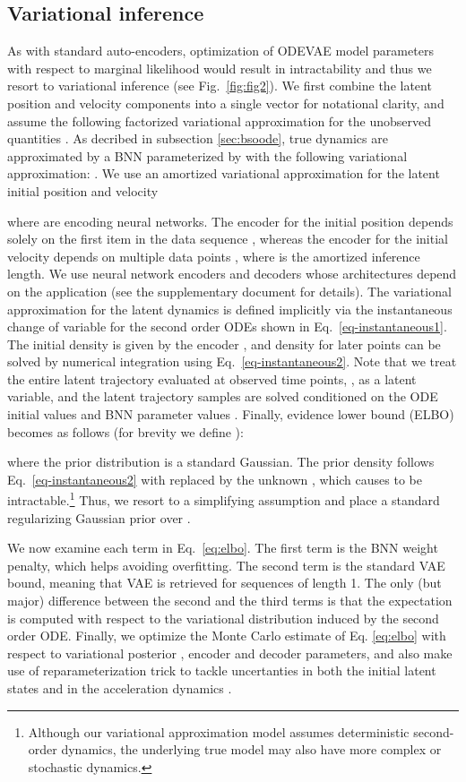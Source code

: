 \documentclass{article}
\newcommand{\0}{\mathbf{0}}
\begin{document}
\subsection{Variational inference}

As with standard auto-encoders, optimization of ODEVAE model parameters with respect to marginal likelihood would result in intractability and thus we resort to variational inference (see Fig.~\ref{fig:fig2}). We first combine the latent position and velocity components into a single vector  for notational clarity, and assume the following factorized variational approximation for the unobserved quantities . As decribed in subsection \ref{sec:bsoode}, true dynamics are approximated by a BNN parameterized by  with the following variational approximation: . We use an amortized variational approximation for the latent initial position and velocity

where  are encoding neural networks. The encoder for the initial position depends solely on the first item in the data sequence , whereas the encoder for the initial velocity depends on multiple data points , where  is the amortized inference length. We use neural network encoders and decoders whose architectures depend on the application (see the supplementary document for details). The variational approximation for the latent dynamics  is defined implicitly via the instantaneous change of variable for the second order ODEs shown in Eq.~\ref{eq-instantaneous1}. The initial density is given by the encoder , and density for later points can be solved by numerical integration using Eq.~\ref{eq-instantaneous2}. Note that we treat the entire latent trajectory evaluated at observed time points, , as a latent variable, and the latent trajectory samples  are solved conditioned on the ODE initial values  and BNN parameter values .  Finally, evidence lower bound (ELBO) becomes as follows (for brevity we define ):
\begingroup
\allowdisplaybreaks
 
\endgroup
where the prior distribution  is a standard Gaussian. The prior density follows Eq.~\ref{eq-instantaneous2} with  replaced by the unknown , which causes  to be intractable.\footnote{Although our variational approximation model assumes deterministic second-order dynamics, the underlying true model may also have more complex or stochastic dynamics.} Thus, we resort to a simplifying assumption and place a standard regularizing Gaussian prior over .

We now examine each term in Eq.~\ref{eq:elbo}. The first term is the BNN weight penalty, which helps avoiding overfitting. The second term is the standard VAE bound, meaning that VAE is retrieved for sequences of length 1. The only (but major) difference between the second and the third terms is that the expectation is computed with respect to the variational distribution induced by the second order ODE. Finally, we optimize the Monte Carlo estimate of Eq. \ref{eq:elbo} with respect to variational posterior , encoder and decoder parameters, and also make use of reparameterization trick to tackle uncertanties in both the initial latent states and in the acceleration dynamics \citep{kingma2013auto}. 
\end{document}
